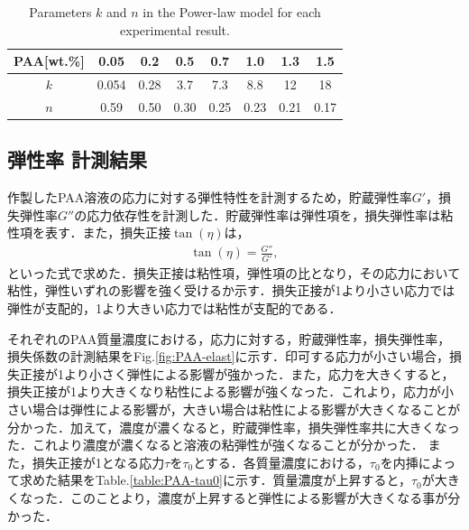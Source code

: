 \begin{table}[h]
	\centering
	\caption{Parameters $k$ and $n$ in the Power-law model for each experimental result.}
	\label{table:power-law}
	\begin{tabular}{c|c|c|c|c|c|c|c} \hline
		PAA[wt.\%] & 0.05  & 0.2  & 0.5  & 0.7  & 1.0  & 1.3  & 1.5  \\ \hline \hline
		$k$        & 0.054 & 0.28 & 3.7  & 7.3  & 8.8  & 12   & 18   \\
		$n$        & 0.59  & 0.50 & 0.30 & 0.25 & 0.23 & 0.21 & 0.17 \\ \hline
	\end{tabular}
\end{table}

\newpage

\subsection{弾性率 計測結果}
\label{sec:elasticity}

作製したPAA溶液の応力に対する弾性特性を計測するため，貯蔵弾性率$G'$，損失弾性率$G''$の応力依存性を計測した．貯蔵弾性率は弾性項を，損失弾性率は粘性項を表す．また，損失正接$\tan\left(\eta\right)$は，
\begin{eqnarray}
	\label{eq:loss_factor}
	\tan\left(\eta\right)=\frac{G''}{G'} ,
\end{eqnarray}
といった式で求めた．損失正接は粘性項，弾性項の比となり，その応力において粘性，弾性いずれの影響を強く受けるか示す．損失正接が1より小さい応力では弾性が支配的，1より大きい応力では粘性が支配的である．

それぞれのPAA質量濃度における，応力に対する，貯蔵弾性率，損失弾性率，損失係数の計測結果をFig.\ref{fig:PAA-elast}に示す．印可する応力が小さい場合，損失正接が1より小さく弾性による影響が強かった．また，応力を大きくすると，損失正接が1より大きくなり粘性による影響が強くなった．これより，応力が小さい場合は弾性による影響が，大きい場合は粘性による影響が大きくなることが分かった．加えて，濃度が濃くなると，貯蔵弾性率，損失弾性率共に大きくなった．これより濃度が濃くなると溶液の粘弾性が強くなることが分かった．
また，損失正接が1となる応力$\tau$を$\tau_0$とする．各質量濃度における，$\tau_0$を内挿によって求めた結果をTable.\ref{table:PAA-tau0}に示す．質量濃度が上昇すると，$\tau_0$が大きくなった．このことより，濃度が上昇すると弾性による影響が大きくなる事が分かった．

